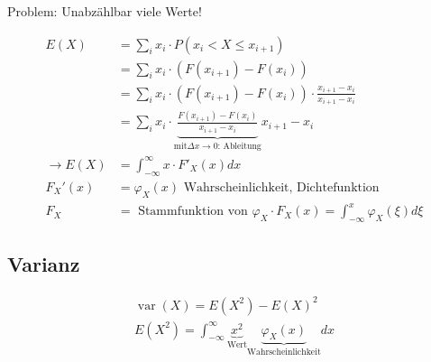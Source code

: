 \documentclass[10pt,a4paper]{scrartcl}
\newif\ifincludeExamples
\DeclareMathOperator{\var}{var}
\begin{document}
Problem: Unabzählbar viele Werte!

\begin{align*}
E(X) & = \sum_i x_i \cdot P(x_i < X \le x_{i+1}) \\
     & = \sum_i x_i \cdot \left(F(x_{i+1}) - F(x_i)\right) \\
     & = \sum_i x_i \cdot \left(F(x_{i+1}) - F(x_i)\right) \cdot \frac{x_{i+1} - x_i}{x_{i+1} - x_i} \\
     & = \sum_i x_i \cdot \underbrace{\frac{F(x_{i+1}) - F(x_i)}{x_{i+1} - x_i}}_{\text{mit} \Delta x \to 0 \text{: Ableitung}} x_{i+1} - x_i \\
\rightarrow  E(X) & = \int_{-\infty}^\infty x\cdot F'_X(x) dx \\
F_X'(x) & = \varphi_X (x)\text{ Wahrscheinlichkeit, Dichtefunktion} \\
F_X & = \text{ Stammfunktion von } \varphi_X \cdot F_X(x) = \int_{-\infty}^x \varphi_X(\xi)d\xi
\end{align*}

\ifincludeExamples
\paragraph{Beispiel $\infty$-Würfel}
\begin{align*}
E(X) & = \int_{-\infty}^\infty x\cdot F'_X(x) dx & \text{F(x) ist } 0 \text{ links und rechts von } 0/2\pi \\
     & = \int_{-0}^{2\pi} x\cdot \frac{1}{2\pi} dx \\
     & = \left[ \frac{1}{4\pi} x^2\right]_0^{2\pi} = \frac{4\pi^2}{4\pi} = \pi
\end{align*}
\fi

\subsection{Varianz}
\begin{align*}
\var(X) = E(X^2) - E(X)^2 \\
E(X^2) = \int_{-\infty}^\infty \underbrace{x^2}_{\text{Wert}} \underbrace{\varphi_X(x)}_{\text{Wahrscheinlichkeit}} dx \\
\end{align*}

\ifincludeExamples
\paragraph{Beispiel $\infty$-Würfel}
\begin{align*}
E(X^2) & = \int_{-\infty}^\infty x^2 \varphi_X(x) dx = \int_{-\infty}^\infty x^2 \frac{1}{2\pi} dx 
         = \left[\frac{x^3}{6\pi}\right]_0^{2\pi} = \frac{8\pi^3}{6\pi} = \frac{4}{3}\pi^2 \\
\var(X) & = E(X^2) - E(X)^2 = \frac{4}{3}\pi^2 - \pi^2 = \frac{1}{3}\pi^2, stddev = \frac{1}{\sqrt{3}}\pi = 0.58\pi
\end{align*}
\fi
\end{document}
